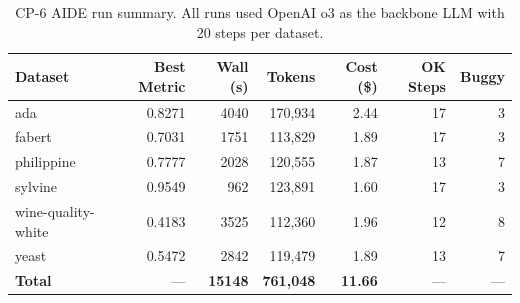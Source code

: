 \begin{table}[htbp]
\centering
\caption{CP-6 AIDE run summary. All runs used OpenAI o3 as the backbone LLM with 20 steps per dataset.}
\label{tab:cp6_trace}
\small
\begin{tabular}{lrrrrrr}
\toprule
Dataset & Best Metric & Wall (s) & Tokens & Cost (\$) & OK Steps & Buggy \\
\midrule
ada & 0.8271 & 4040 & 170,934 & 2.44 & 17 & 3 \\
fabert & 0.7031 & 1751 & 113,829 & 1.89 & 17 & 3 \\
philippine & 0.7777 & 2028 & 120,555 & 1.87 & 13 & 7 \\
sylvine & 0.9549 & 962 & 123,891 & 1.60 & 17 & 3 \\
wine-quality-white & 0.4183 & 3525 & 112,360 & 1.96 & 12 & 8 \\
yeast & 0.5472 & 2842 & 119,479 & 1.89 & 13 & 7 \\
\midrule
\textbf{Total} & --- & \textbf{15148} & \textbf{761,048} & \textbf{11.66} & --- & --- \\
\bottomrule
\end{tabular}
\end{table}